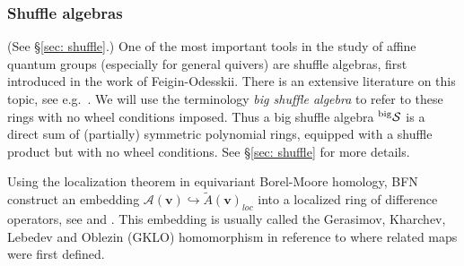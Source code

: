 \documentclass[11pt,reqno]{amsart}
\renewcommand{\mathbf}{\mathbold}
\numberwithin{equation}{section}
\theoremstyle{definition}
\newcommand{\cA}{\mathcal{A}}
\newcommand{\cS}{\mathcal{S}}
\newcommand{\bv}{\mathbf{v}}
\renewcommand{\tilde}[1]{\widetilde{#1}}
\newcommand{\leftexp}[2]{\vphantom{#2}^{#1} #2}
\renewcommand{\bv}{\mathbf{v}} %
\newcommand{\qzast}{\cA}
\newcommand{\GKLO}[1]{\tilde{A}(#1)_{loc}}
\newcommand{\preshu}{\leftexp{\mathrm{big}}{\cS}}
\begin{document}
\subsubsection{Shuffle algebras}
(See \S \ref{sec: shuffle}.)
One of the most important tools in the study of affine quantum groups (especially for general quivers) are shuffle algebras, first introduced in the work of Feigin-Odesskii. There  is an extensive literature on this topic, see e.g.~\cite{FO,Negut1,Negut2,FT2,Tsymbaliuk2}. We will use the terminology \emph{big shuffle algebra} to refer to these rings with no wheel conditions imposed. Thus a big shuffle algebra $\preshu$ is a direct sum of (partially) symmetric polynomial rings, equipped with a shuffle product but with no wheel conditions. See \S \ref{sec: shuffle} for more details.

Using the localization theorem in equivariant Borel-Moore homology, BFN construct an embedding $\qzast(\bv) \hookrightarrow \GKLO{\bv}$ into a localized ring of difference operators, see \cite[Remark 5.23]{BFN1} and \cite[Appendix A]{BFN2}. This embedding is usually called the Gerasimov, Kharchev, Lebedev and Oblezin (GKLO) homomorphism in reference to \cite{GKLO} where related maps were first defined. 
\end{document}
